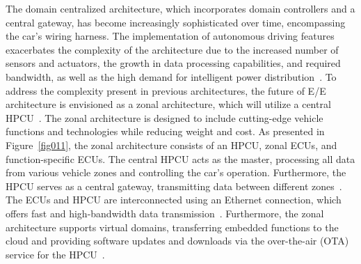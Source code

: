     
    
    
    The domain centralized architecture, which incorporates domain controllers and a central gateway, has become increasingly sophisticated over time, encompassing the car's wiring harness. The implementation of autonomous driving features exacerbates the complexity of the architecture due to the increased number of sensors and actuators, the growth in data processing capabilities, and required bandwidth, as well as the high demand for intelligent power distribution~\cite{askaripoor2023designer,askaripoor2023designer,9613692}. To address the complexity present in previous architectures, the future of E/E architecture is envisioned as a zonal architecture, which will utilize a central HPCU~\cite{askaripoor2023designer}. The zonal architecture is designed to include cutting-edge vehicle functions and technologies while reducing weight and cost. As presented in Figure~\ref{fig011}, the zonal architecture consists of an HPCU, zonal ECUs, and function-specific ECUs. The central HPCU acts as the master, processing all data from various vehicle zones and controlling the car's operation.
    Furthermore, the HPCU serves as a central gateway, transmitting data between different zones~\cite{jiang2019vehicle}. The ECUs and HPCU are interconnected using an Ethernet connection, which offers fast and high-bandwidth data transmission~\cite{9565115,askaripoor2022architecture}. Furthermore, the zonal architecture supports virtual domains, transferring embedded functions to the cloud and providing software updates and downloads via the over-the-air (OTA) service for the HPCU~\cite{askaripoor2022architecture}.
    
